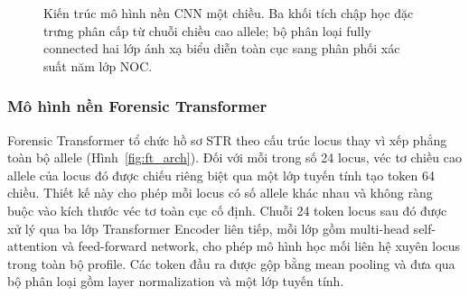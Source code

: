 \documentclass[12pt,a4paper]{article}
\begin{document}
\begin{figure}[H]
\centering
{}
\caption{Kiến trúc mô hình nền CNN một chiều. Ba khối tích chập học đặc trưng phân cấp từ chuỗi chiều cao allele; bộ phân loại fully connected hai lớp ánh xạ biểu diễn toàn cục sang phân phối xác suất năm lớp NOC.}
\label{fig:cnn_arch}
\end{figure}

\subsubsection{Mô hình nền Forensic Transformer}

Forensic Transformer tổ chức hồ sơ STR theo cấu trúc locus thay vì xếp phẳng toàn bộ allele (Hình~\ref{fig:ft_arch}). Đối với mỗi trong số 24 locus, véc tơ chiều cao allele của locus đó được chiếu riêng biệt qua một lớp tuyến tính tạo token 64 chiều. Thiết kế này cho phép mỗi locus có số allele khác nhau và không ràng buộc vào kích thước véc tơ toàn cục cố định. Chuỗi 24 token locus sau đó được xử lý qua ba lớp Transformer Encoder liên tiếp, mỗi lớp gồm multi-head self-attention và feed-forward network, cho phép mô hình học mối liên hệ xuyên locus trong toàn bộ profile. Các token đầu ra được gộp bằng mean pooling và đưa qua bộ phân loại gồm layer normalization và một lớp tuyến tính.
\end{document}
